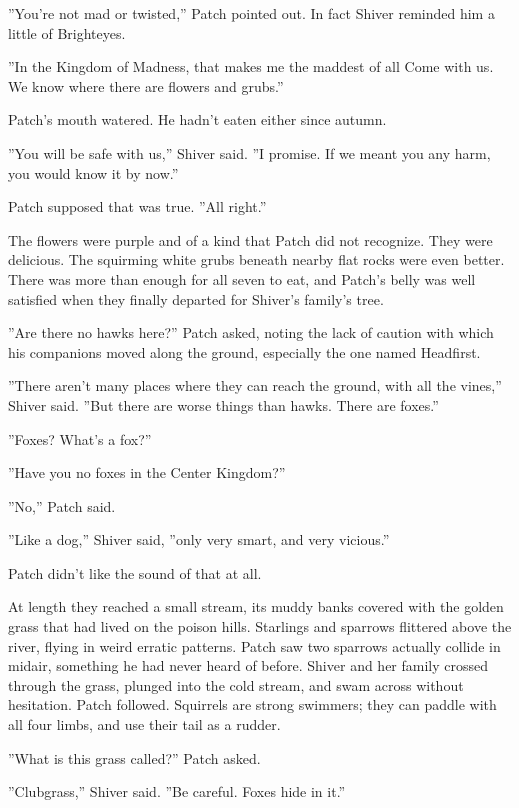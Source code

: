 \documentclass[11pt]{article}
\begin{document}
 ''You're not mad or twisted,'' Patch pointed out. In fact Shiver reminded him a little of Brighteyes.\par
 ''In the Kingdom of Madness, that makes me the maddest of all %
 Come with us. We know where there are flowers and grubs.''\par
 Patch's mouth watered. He hadn't eaten either since autumn.\par
 ''You will be safe with us,'' Shiver said. ''I promise. If we meant you any harm, you would know it by now.''\par
 Patch supposed that was true. ''All right.''\par
 The flowers were purple and of a kind that Patch did not recognize. They were delicious. The squirming white grubs beneath nearby flat rocks were even better. There was more than enough for all seven to eat, and Patch's belly was well satisfied when they finally departed for Shiver's family's tree.\par
 ''Are there no hawks here?'' Patch asked, noting the lack of caution with which his companions moved along the ground, especially the one named Headfirst. \par
 ''There aren't many places where they can reach the ground, with all the vines,'' Shiver said. ''But there are worse things than hawks. There are foxes.''\par
 ''Foxes? What's a fox?''\par
 ''Have you no foxes in the Center Kingdom?''\par
 ''No,'' Patch said.\par
 ''Like a dog,'' Shiver said, ''only very smart, and very vicious.''\par
 Patch didn't like the sound of that at all.\par
 At length they reached a small stream, its muddy banks covered with the golden grass that had lived on the poison hills. Starlings and sparrows flittered above the river, flying in weird erratic patterns. Patch saw two sparrows actually collide in midair, something he had never heard of before. Shiver and her family crossed through the grass, plunged into the cold stream, and swam across without hesitation. Patch followed. Squirrels are strong swimmers; they can paddle with all four limbs, and use their tail as a rudder.\par
 ''What is this grass called?'' Patch asked.\par
 ''Clubgrass,'' Shiver said. ''Be careful. Foxes hide in it.''\par
\end{document}
